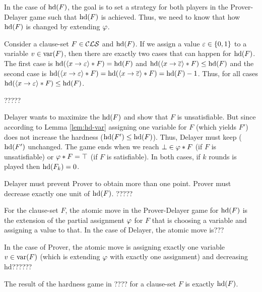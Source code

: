 \documentclass{report}
\begin{document}
In the case of $\operatorname{hd}(F)$, the goal is to set a strategy for both players in the Prover-Delayer game such that $\operatorname{hd}(F)$ is achieved. Thus, we need to know that how $\operatorname{hd}(F)$ is changed by extending $\varphi$. 

\begin{lem}\label{lem:hd-var}
Consider a clause-set $F \in \mathcal{CLS}$ and $\operatorname{hd}(F)$. If we assign a value $\varepsilon \in \{ 0,1 \}$ to a variable $v \in \operatorname{var}(F)$, then there are exactly two cases that can happen for $\operatorname{hd}(F)$. The first case is $\operatorname{hd}(\langle x \rightarrow \varepsilon \rangle*F)=\operatorname{hd}(F)$ and $\operatorname{hd}(\langle x \rightarrow \overline {\varepsilon} \rangle*F) \leq \operatorname{hd}(F)$ and the second case is  $\operatorname{hd}(\langle x \rightarrow \varepsilon \rangle*F)=\operatorname{hd}(\langle x \rightarrow \overline {\varepsilon} \rangle*F)=\operatorname{hd}(F)-1$. Thus, for all cases  $\operatorname{hd}(\langle x \rightarrow \varepsilon \rangle*F) \leq \operatorname{hd}(F)$.
\end{lem}
\begin{prf}
?????
\end{prf}

Delayer wants to maximize the $\operatorname{hd}(F)$ and show that $F$ is unsatisfiable. But since according to Lemma \ref{lem:hd-var} assigning one variable for $F$ (which yields $F'$) does not increase the hardness ($\operatorname{hd}(F') \leq \operatorname{hd}(F)$). Thus, Delayer must keep ($\operatorname{hd}(F')$ unchanged. The game ends when we reach $\bot \in \varphi * F $ (if $F$ is unsatisfiable) or $\varphi * F=\top$ (if $F$ is satisfiable). In both cases, if $k$ rounds is played then $\operatorname{hd}(F_k)=0$.

Delayer must prevent Prover to obtain more than one point. Prover must decrease exactly one unit of $\operatorname{hd}(F)$. ?????

\begin{defi}\label{def:atomic-move}
For the clause-set $F$, the atomic move in the Prover-Delayer game for $\operatorname{hd}(F)$ is the extension of the partial assignment $\varphi$ for $F$ that is choosing a variable and assigning a value to that. 
In the case of Delayer, the atomic move is???

In the case of Prover, the atomic move is assigning exactly one variable $v \in \operatorname{var}(F)$ (which is extending $\varphi$ with exactly one assignment) and decreasing hd??????
\end{defi}

\begin{lem}\label{lem:game1}
The result of the hardness game in ???? for a clause-set $F$ is exactly $\operatorname{hd}(F)$.
\end{lem}
\end{document}
